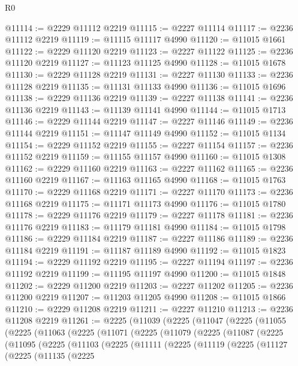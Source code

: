 \begin{lexlean}{R0}
\begin{coremodule}
@11114 := @2229 @11112 @2219
@11115 := @2227 @11114
@11117 := @2236 @11112 @2219
@11119 := @11115 @11117 @4990
@11120 := @11015 @1661
@11122 := @2229 @11120 @2219
@11123 := @2227 @11122
@11125 := @2236 @11120 @2219
@11127 := @11123 @11125 @4990
@11128 := @11015 @1678
@11130 := @2229 @11128 @2219
@11131 := @2227 @11130
@11133 := @2236 @11128 @2219
@11135 := @11131 @11133 @4990
@11136 := @11015 @1696
@11138 := @2229 @11136 @2219
@11139 := @2227 @11138
@11141 := @2236 @11136 @2219
@11143 := @11139 @11141 @4990
@11144 := @11015 @1713
@11146 := @2229 @11144 @2219
@11147 := @2227 @11146
@11149 := @2236 @11144 @2219
@11151 := @11147 @11149 @4990
@11152 := @11015 @1134
@11154 := @2229 @11152 @2219
@11155 := @2227 @11154
@11157 := @2236 @11152 @2219
@11159 := @11155 @11157 @4990
@11160 := @11015 @1308
@11162 := @2229 @11160 @2219
@11163 := @2227 @11162
@11165 := @2236 @11160 @2219
@11167 := @11163 @11165 @4990
@11168 := @11015 @1763
@11170 := @2229 @11168 @2219
@11171 := @2227 @11170
@11173 := @2236 @11168 @2219
@11175 := @11171 @11173 @4990
@11176 := @11015 @1780
@11178 := @2229 @11176 @2219
@11179 := @2227 @11178
@11181 := @2236 @11176 @2219
@11183 := @11179 @11181 @4990
@11184 := @11015 @1798
@11186 := @2229 @11184 @2219
@11187 := @2227 @11186
@11189 := @2236 @11184 @2219
@11191 := @11187 @11189 @4990
@11192 := @11015 @1823
@11194 := @2229 @11192 @2219
@11195 := @2227 @11194
@11197 := @2236 @11192 @2219
@11199 := @11195 @11197 @4990
@11200 := @11015 @1848
@11202 := @2229 @11200 @2219
@11203 := @2227 @11202
@11205 := @2236 @11200 @2219
@11207 := @11203 @11205 @4990
@11208 := @11015 @1866
@11210 := @2229 @11208 @2219
@11211 := @2227 @11210
@11213 := @2236 @11208 @2219
@11261 := @2225
    (@11039
      (@2225
        (@11047
          (@2225
            (@11055
              (@2225
                (@11063
                  (@2225
                    (@11071
                      (@2225
                        (@11079
                          (@2225
                            (@11087
                              (@2225
                                (@11095
                                  (@2225
                                    (@11103
                                      (@2225
                                        (@11111
                                          (@2225
                                            (@11119
                                              (@2225
                                                (@11127
                                                  (@2225
                                                    (@11135
                                                      (@2225

\end{coremodule}
\end{lexlean}
